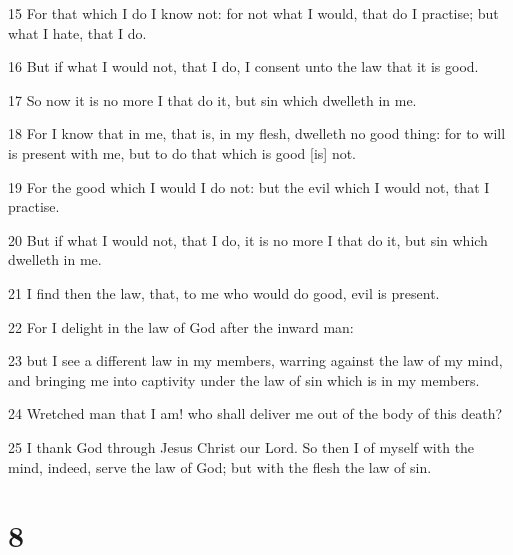 \par 15 For that which I do I know not: for not what I would, that do I practise; but what I hate, that I do.
\par 16 But if what I would not, that I do, I consent unto the law that it is good.
\par 17 So now it is no more I that do it, but sin which dwelleth in me.
\par 18 For I know that in me, that is, in my flesh, dwelleth no good thing: for to will is present with me, but to do that which is good [is] not.
\par 19 For the good which I would I do not: but the evil which I would not, that I practise.
\par 20 But if what I would not, that I do, it is no more I that do it, but sin which dwelleth in me.
\par 21 I find then the law, that, to me who would do good, evil is present.
\par 22 For I delight in the law of God after the inward man:
\par 23 but I see a different law in my members, warring against the law of my mind, and bringing me into captivity under the law of sin which is in my members.
\par 24 Wretched man that I am! who shall deliver me out of the body of this death?
\par 25 I thank God through Jesus Christ our Lord. So then I of myself with the mind, indeed, serve the law of God; but with the flesh the law of sin.

\chapter{8}

